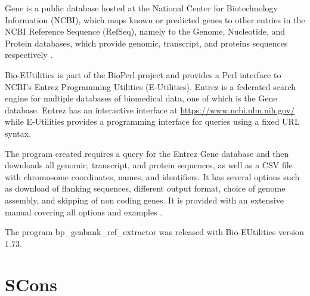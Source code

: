 Gene is a public database hosted at the National Center for
Biotechnology Information (NCBI), which maps known or predicted genes
to other entries in the NCBI Reference Sequence (RefSeq), namely to
the Genome, Nucleotide, and Protein databases, which provide genomic,
transcript, and proteins sequences respectively \citep{gene-database}.

Bio-EUtilities is part of the BioPerl project and provides a Perl
interface to NCBI's Entrez Programming Utilities (E-Utilities).
Entrez is a federated search engine for multiple databases of
biomedical data, one of which is the Gene database.  Entrez has an
interactive interface at \url{https://www.ncbi.nlm.nih.gov/} while
E-Utilities provides a programming interface for queries using a fixed
URL syntax.

The program created requires a query for the Entrez Gene database and
then downloads all genomic, transcript, and protein sequences, as well
as a CSV file with chromosome coordinates, names, and identifiers.  It
has several options such as download of flanking sequences, different
output format, choice of genome assembly, and skipping of non coding
genes.  It is provided with an extensive manual covering all options
and examples .

The program bp\_genbank\_ref\_extractor was released with
Bio-EUtilities version 1.73.


\section{SCons}
